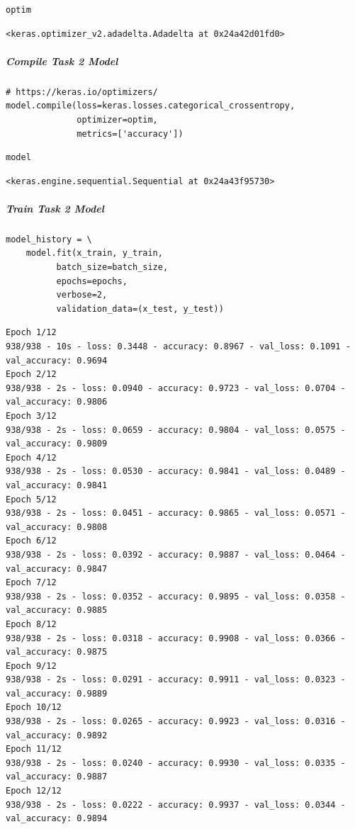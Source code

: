 \begin{verbatim}
optim
\end{verbatim}

\begin{verbatim}
<keras.optimizer_v2.adadelta.Adadelta at 0x24a42d01fd0>
\end{verbatim}

\subparagraph{Compile Task 2 Model}

\begin{verbatim}
# https://keras.io/optimizers/ 
model.compile(loss=keras.losses.categorical_crossentropy,
              optimizer=optim,
              metrics=['accuracy'])
\end{verbatim}

\begin{verbatim}
model
\end{verbatim}

\begin{verbatim}
<keras.engine.sequential.Sequential at 0x24a43f95730>
\end{verbatim}

\subparagraph{Train Task 2 Model}

\begin{verbatim}
model_history = \
    model.fit(x_train, y_train,
          batch_size=batch_size,
          epochs=epochs,
          verbose=2,
          validation_data=(x_test, y_test))
\end{verbatim}

\begin{verbatim}
Epoch 1/12
938/938 - 10s - loss: 0.3448 - accuracy: 0.8967 - val_loss: 0.1091 - val_accuracy: 0.9694
Epoch 2/12
938/938 - 2s - loss: 0.0940 - accuracy: 0.9723 - val_loss: 0.0704 - val_accuracy: 0.9806
Epoch 3/12
938/938 - 2s - loss: 0.0659 - accuracy: 0.9804 - val_loss: 0.0575 - val_accuracy: 0.9809
Epoch 4/12
938/938 - 2s - loss: 0.0530 - accuracy: 0.9841 - val_loss: 0.0489 - val_accuracy: 0.9841
Epoch 5/12
938/938 - 2s - loss: 0.0451 - accuracy: 0.9865 - val_loss: 0.0571 - val_accuracy: 0.9808
Epoch 6/12
938/938 - 2s - loss: 0.0392 - accuracy: 0.9887 - val_loss: 0.0464 - val_accuracy: 0.9847
Epoch 7/12
938/938 - 2s - loss: 0.0352 - accuracy: 0.9895 - val_loss: 0.0358 - val_accuracy: 0.9885
Epoch 8/12
938/938 - 2s - loss: 0.0318 - accuracy: 0.9908 - val_loss: 0.0366 - val_accuracy: 0.9875
Epoch 9/12
938/938 - 2s - loss: 0.0291 - accuracy: 0.9911 - val_loss: 0.0323 - val_accuracy: 0.9889
Epoch 10/12
938/938 - 2s - loss: 0.0265 - accuracy: 0.9923 - val_loss: 0.0316 - val_accuracy: 0.9892
Epoch 11/12
938/938 - 2s - loss: 0.0240 - accuracy: 0.9930 - val_loss: 0.0335 - val_accuracy: 0.9887
Epoch 12/12
938/938 - 2s - loss: 0.0222 - accuracy: 0.9937 - val_loss: 0.0344 - val_accuracy: 0.9894
\end{verbatim}

